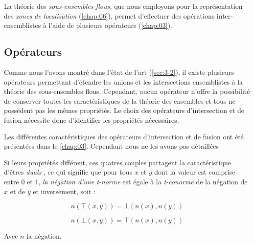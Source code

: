 %
La théorie des \emph{sous-ensembles flous,} que nous employons pour la
représentation des \emph{zones de localisation} (\autoref{chap:06}),
permet d'effectuer des opérations inter-ensemblistes à l'aide de
plusieurs opérateurs (\autoref{chap:03}). 

\subsection{Opérateurs}

Comme nous l'avons montré dans l'état de l'art (\autoref{sec:3-2}), il
existe plusieurs opérateurs permettant d'étendre les unions et les
intersections ensemblistes à la théorie des sous-ensembles
flous. Cependant, aucun opérateur n'offre la possibilité de conserver
toutes les caractéristiques de la théorie des ensembles et tous
ne possèdent pas les mêmes propriétés. Le choix des opérateurs
d'intersection et de fusion nécessite donc d'identifier les
propriétés nécessaires.


Les différentes caractéristiques des opérateurs d'intersection et de
fusion ont été présentées dans le \autoref{chap:03}. Cependant nous ne
les avons pas détaillées 



Si leurs propriétés différent, ces quatres couples partagent la
caractéristique d'êtres \emph{duals} \autocite{Bouchon-Meunier2007},
ce qui signifie que pour tous \(x\) et \(y\) dont la valeur est
comprise entre 0 et 1, \emph{la négation d'une \emph{t-norme}} est
égale à la \emph{t-conorme} de la négation de \(x\) et de \(y\) et
inversement, soit :

\begin{equation}
  n(⊤(x,y)) = ⊥(n(x), n(y))
\end{equation}

\begin{equation}
  n(⊥(x,y)) = ⊤(n(x), n(y))
\end{equation}

Avec \(n\) la négation.




